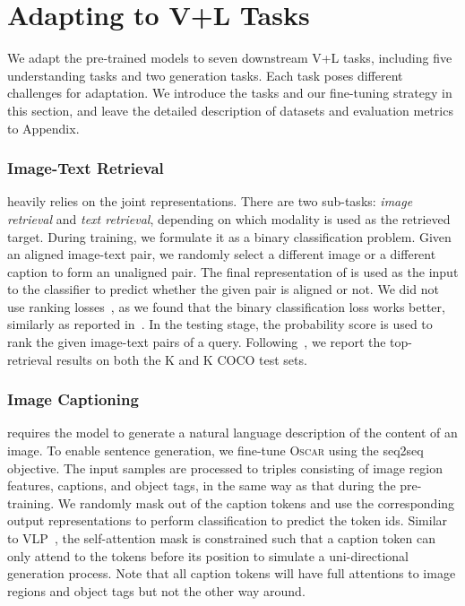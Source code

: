 \documentclass[runningheads]{llncs}
\newcommand{\short}{\textsc{Oscar}}
\def\secvspace{{\vspace{-4mm}}}
\begin{document}
\section{Adapting to V+L Tasks} 
We adapt the pre-trained models to seven downstream V+L tasks, including five understanding tasks and two generation tasks. Each task poses different challenges for adaptation. We introduce the tasks and our fine-tuning strategy in this section, and leave the detailed description of datasets and evaluation metrics to Appendix.

\secvspace
\subsubsection{Image-Text Retrieval} heavily relies on the joint representations. There are two sub-tasks: {\it image retrieval} and {\it text retrieval}, depending on which modality is used as the retrieved target.
During training, we formulate it as a binary classification problem. Given an aligned image-text pair, we randomly select a different image or a different caption to form an unaligned pair. The final representation of  is used as the input to the classifier to predict whether the given pair is aligned or not. We did not use ranking losses~\cite{karpathy2015deep,lee2018stacked}, as we found that the binary classification loss works better, similarly as reported in~\cite{qi2020imagebert}. In the testing stage, the probability score is used to rank the given image-text pairs of a query. Following~\cite{li2019unicoder}, we report the top- retrieval results on both the K and K COCO test sets.


\secvspace
\subsubsection{Image Captioning}
\label{sec:image_cap} requires the model to generate a natural language description of the content of an image. To enable sentence generation, we fine-tune \short{} using the seq2seq objective. The input samples are processed to triples consisting of image region features, captions, and object tags, in the same way as that during the pre-training. We randomly mask out  of the caption tokens and use the corresponding output representations to perform classification to predict the token ids. Similar to VLP~\cite{zhou2019unified}, the self-attention mask is constrained such that a caption token can only attend to the tokens before its position to simulate a uni-directional generation process.  
Note that all caption tokens will have full attentions to image regions and object tags but not the other way around. 
\end{document}
